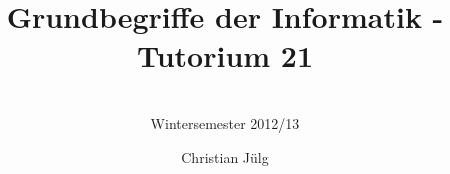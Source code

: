 
\title[GBI Tutorium 21]{Grundbegriffe der Informatik - Tutorium 21}%
\subtitle{
\insertauthor 
\\
Wintersemester 2012/13
\\
\insertdate 
}
\author[\hspace{2em}Christian Jülg]{Christian Jülg}
